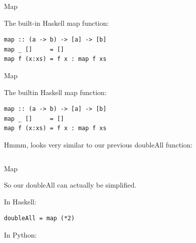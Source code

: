 \documentclass[mathserif]{beamer}
\begin{document}
\begin{frame}[fragile]{Map}

The built-in Haskell map function:

\begin{verbatim}
map :: (a -> b) -> [a] -> [b]
map _ []     = []
map f (x:xs) = f x : map f xs
  \end{verbatim}

\end{frame}

\begin{frame}[fragile]{Map}

The builtin Haskell map function:
\begin{verbatim}
map :: (a -> b) -> [a] -> [b]
map _ []     = []
map f (x:xs) = f x : map f xs
  \end{verbatim}

  \vskip5mm

Hmmm, looks very similar to our previous doubleAll function:

\inputminted[fontsize=\Large,lastline=3]{haskell}{code/haskell/doubleall_recursion.hs}
\end{frame}

\begin{frame}[fragile]{Map}

So our doubleAll can actually be simplified.

  \vskip5mm

In Haskell:
\begin{verbatim}
doubleAll = map (*2)
  \end{verbatim}

  \vskip5mm

In Python:
\inputminted[fontsize=\Large,firstline=3,lastline=4]{python}{code/python/doubleall_map.py}
\end{frame}
\end{document}
